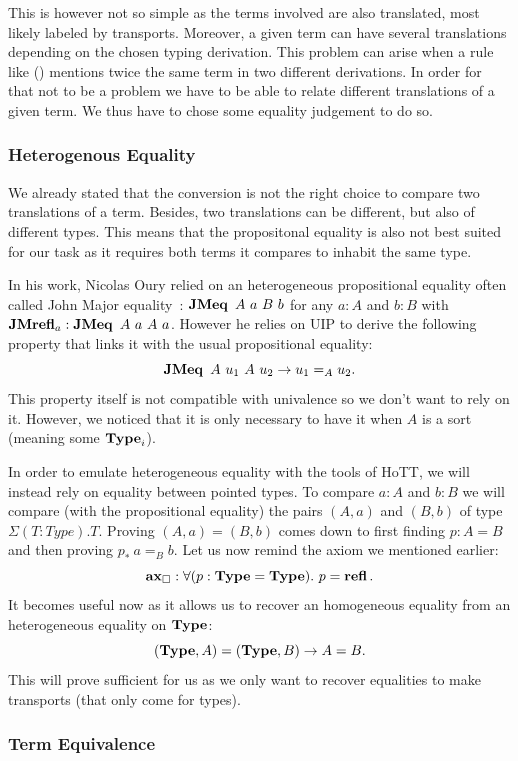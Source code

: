 \documentclass[11pt]{article}
\theoremstyle{plain}
\theoremstyle{remark}
\begin{document}
This is however not so simple as the terms involved are also translated,
most likely labeled by transports. Moreover, a given term can have
several translations depending on the chosen typing derivation.
This problem can arise when a rule like () mentions twice the
same term in two different derivations.
In order for that not to be a problem we have to be able to relate different
translations of a given term. We thus have to chose some equality judgement
to do so.

\subsubsection{Heterogenous Equality}

We already stated that the conversion is not the right choice to compare two
translations of a term.
Besides, two translations can be different, but also of different types.
This means that the propositonal equality is also not best suited for our task
as it requires both terms it compares to inhabit the same type.

In his work, Nicolas Oury relied on an heterogeneous propositional equality
often called John Major equality~\cite{mcbride2000dependently}:
$\operatorname{\mathbf{JMeq}}\ A\ a\ B\ b$ for any $a : A$ and $b: B$
with $\operatorname{\mathbf{JMrefl}}_a : \operatorname{\mathbf{JMeq}}\ A\ a\ A\ a$.
However he relies on UIP to derive the following property that links it with
the usual propositional equality:
\[\operatorname{\mathbf{JMeq}}\ A\ u_1\ A\ u_2 \to u_1 =_A u_2.\]
This property itself is not compatible with univalence so we don't want to rely
on it. However, we noticed that it is only necessary to have it when $A$ is a
sort (meaning some $\operatorname{\mathbf{Type}}_i$).

In order to emulate heterogeneous equality with the tools of HoTT, we will
instead rely on equality between pointed types.
To compare $a : A$ and $b : B$ we will compare (with the propositional equality)
the pairs $(A,a)$ and $(B,b)$ of type $\Sigma (T : Type).T$.
Proving $(A,a) = (B,b)$ comes down to first finding $p : A = B$ and then
proving $p_*\ a =_B b$.
Let us now remind the axiom we mentioned earlier:
\[ \operatorname{\mathbf{ax}_\square} : \forall (p : \operatorname{\mathbf{Type}} = \operatorname{\mathbf{Type}}).\ p = \operatorname{\mathbf{refl}}. \]
It becomes useful now as it allows us to recover an homogeneous equality from
an heterogeneous equality on $\operatorname{\mathbf{Type}}$:
\[ (\operatorname{\mathbf{Type}}, A) = (\operatorname{\mathbf{Type}}, B) \to A = B. \]
This will prove sufficient for us as we only want to recover equalities to
make transports (that only come for types).

\subsubsection{Term Equivalence}
\end{document}
